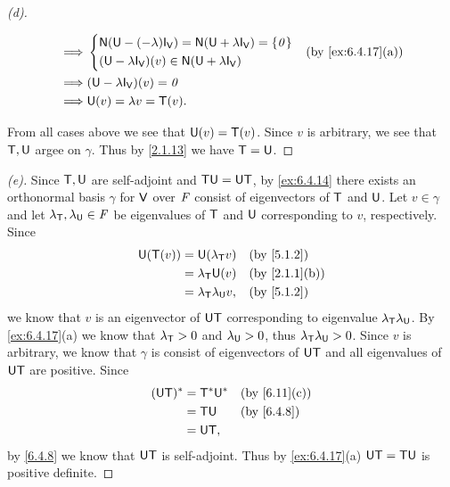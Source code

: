 \begin{proof}[(d)]
\begin{itemize}
\begin{align*}
			      \implies & \begin{dcases}
				                 \ns{\U - (-\lambda) \IT[\V]} = \ns{\U + \lambda \IT[\V]} = \set{\zv} \\
				                 (\U - \lambda \IT[\V])(v) \in \ns{\U + \lambda \IT[\V]}
			                 \end{dcases} &  & \by{ex:6.4.17}[a]                    \\
			      \implies & (\U - \lambda \IT[\V])(v) = \zv                                                                                         \\
			      \implies & \U(v) = \lambda v = \T(v).
		      \end{align*}
	\end{itemize}
	From all cases above we see that \(\mathsf{U}(v) = \mathsf{T}(v)\).
	Since \(v\) is arbitrary, we see that \(\mathsf{T}, \mathsf{U}\) argee on \(\gamma\).
	Thus by \cref{2.1.13} we have \(\mathsf{T} = \mathsf{U}\).
\end{proof}

\begin{proof}[(e)]
	Since \(\mathsf{T}, \mathsf{U}\) are self-adjoint and \(\mathsf{T} \mathsf{U} = \mathsf{U} \mathsf{T}\), by \cref{ex:6.4.14} there exists an orthonormal basis \(\gamma\) for \(\mathsf{V}\) over \(\mathit{F}\) consist of eigenvectors of \(\mathsf{T}\) and \(\mathsf{U}\).
	Let \(v \in \gamma\) and let \(\lambda_{\mathsf{T}}, \lambda_{\mathsf{U}} \in \mathit{F}\) be eigenvalues of \(\mathsf{T}\) and \(\mathsf{U}\) corresponding to \(v\), respectively.
	Since
	\begin{align*}
		\U(\T(v)) & = \U(\lambda_{\T} v)           &  & \by{5.1.2}    \\
		          & = \lambda_{\T} \U(v)           &  & \by{2.1.1}[b] \\
		          & = \lambda_{\T} \lambda_{\U} v, &  & \by{5.1.2}
	\end{align*}
	we know that \(v\) is an eigenvector of \(\mathsf{U} \mathsf{T}\) corresponding to eigenvalue \(\lambda_{\mathsf{T}} \lambda_{\mathsf{U}}\).
	By \cref{ex:6.4.17}(a) we know that \(\lambda_{\mathsf{T}} > 0\) and \(\lambda_{\mathsf{U}} > 0\), thus \(\lambda_{\mathsf{T}} \lambda_{\mathsf{U}} > 0\).
	Since \(v\) is arbitrary, we know that \(\gamma\) is consist of eigenvectors of \(\mathsf{U} \mathsf{T}\) and all eigenvalues of \(\mathsf{U} \mathsf{T}\) are positive.
	Since
	\begin{align*}
		(\U \T)^* & = \T^* \U^* &  & \by{6.11}[c] \\
		          & = \T \U     &  & \by{6.4.8}   \\
		          & = \U \T,
	\end{align*}
	by \cref{6.4.8} we know that \(\mathsf{U} \mathsf{T}\) is self-adjoint.
	Thus by \cref{ex:6.4.17}(a) \(\mathsf{U} \mathsf{T} = \mathsf{T} \mathsf{U}\) is positive definite.
\end{proof}

